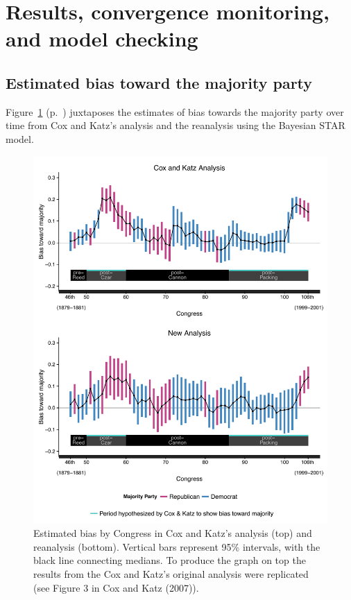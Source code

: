 \section{Results, convergence monitoring, and model checking}
\label{results_convergence_checking}

\subsection[Estimates]{Estimated bias toward the majority party}
\label{results}

Figure~\ref{fig:ck_bias} (p.~\pageref{fig:ck_bias}) juxtaposes the estimates of bias towards the majority party over time from Cox and Katz's analysis and the reanalysis using the Bayesian STAR model.

\begin{figure}
\centering
\includegraphics[scale=0.75]{sections/figs/ck_replication}
\caption{Estimated bias by Congress in Cox and Katz's analysis (top) and reanalysis (bottom). Vertical bars represent 95\%  intervals, with the black line connecting medians. To produce the graph on top the results from the Cox and Katz's original analysis were replicated (see Figure 3 in Cox and Katz (2007)).}
\label{fig:ck_bias}
\end{figure}

